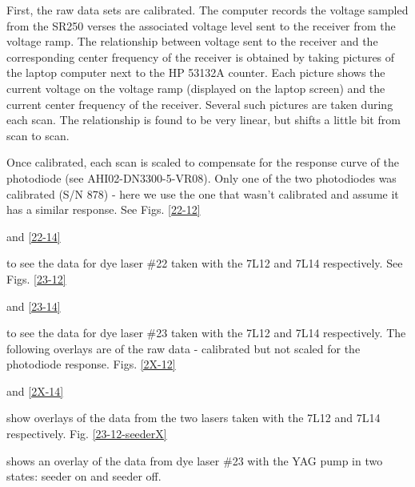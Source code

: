 First, the raw data sets are calibrated. The computer records the voltage sampled from the SR250 verses the associated voltage level sent to the receiver from the voltage ramp. The relationship between voltage sent to the receiver and the corresponding center frequency of the receiver is obtained by taking pictures of the laptop computer next to the HP 53132A counter. Each picture shows the current voltage on the voltage ramp (displayed on the laptop screen) and the current center frequency of the receiver. Several such pictures are taken during each scan. The relationship is found to be very linear, but shifts a little bit from scan to scan.

Once calibrated, each scan is scaled to compensate for the response curve of the photodiode (see AHI02-DN3300-5-VR08). Only one of the two photodiodes was calibrated (S/N 878) - here we use the one that wasn't calibrated and assume it has a similar response. See Figs. \ref{22-12}

and \ref{22-14}

to see the data for dye laser \#22 taken with the 7L12 and 7L14 respectively. See Figs. \ref{23-12}

and \ref{23-14}

to see the data for dye laser \#23 taken with the 7L12 and 7L14 respectively. The following overlays are of the raw data - calibrated but not scaled for the photodiode response. Figs. \ref{2X-12}

and \ref{2X-14}

show overlays of the data from the two lasers taken with the 7L12 and 7L14 respectively. Fig. \ref{23-12-seederX}

shows an overlay of the data from dye laser \#23 with the YAG pump in two states: seeder on and seeder off.

